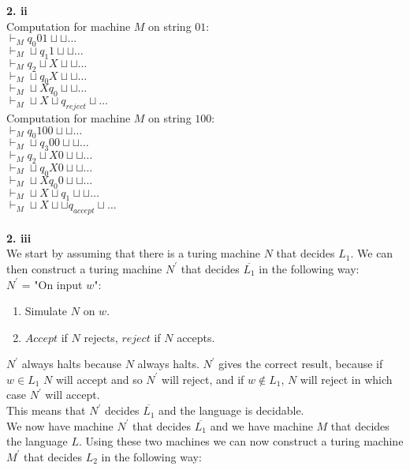 \documentclass[a4paper,12pt]{article}
\begin{document}
\textbf{2. ii} \\
Computation for machine $M$ on string $01$: \\
$\vdash_M q_0 0 1 \sqcup \sqcup \dots$ \\
$\vdash_M \sqcup q_1 1 \sqcup \sqcup \dots$ \\
$\vdash_M q_2 \sqcup X \sqcup \sqcup \dots$ \\
$\vdash_M \sqcup q_0 X \sqcup \sqcup \dots$ \\
$\vdash_M \sqcup X q_0 \sqcup \sqcup \dots$ \\
$\vdash_M \sqcup X \sqcup q_{reject} \sqcup \dots$ \\
Computation for machine $M$ on string $100$: \\ 
$\vdash_M q_0 1 0 0 \sqcup \sqcup \dots$ \\
$\vdash_M \sqcup q_3 0 0 \sqcup \sqcup \dots$ \\
$\vdash_M q_2 \sqcup X 0 \sqcup \sqcup \dots$ \\
$\vdash_M \sqcup q_0 X 0 \sqcup \sqcup \dots$ \\
$\vdash_M \sqcup X q_0 0 \sqcup \sqcup \dots$ \\
$\vdash_M \sqcup X \sqcup q_1 \sqcup \sqcup \dots$ \\
$\vdash_M \sqcup X \sqcup \sqcup q_{accept} \sqcup \dots$ \\
\\
\textbf{2. iii} \\
We start by assuming that there is a turing machine $N$ that decides $L_1$. We can then construct a turing machine $N^{'}$ that decides $\overline{L_1}$ in the following way: \\
$N^{'}$ = "On input $w$": 
\begin{enumerate}
\item Simulate $N$ on $w$.
\item $Accept$ if $N$ rejects, $reject$ if $N$ accepts.
\end{enumerate} 
$N^{'}$ always halts because $N$ always halts. $N^{'}$ gives the correct result, because if $w \in L_1$ $N$ will accept and so $N^{'}$ will reject, and if $w \notin L_1$, $N$ will reject in which case $N^{'}$ will accept. \\
This means that $N^{'}$ decides $\overline{L_1}$ and the language is decidable. \\ 
We now have machine $N^{'}$ that decides $\overline{L_1}$ and we have machine $M$ that decides the language $L$. Using these two machines we can now construct a turing machine $M^{'}$ that decides $L_2$ in the following way:\\ 
\end{document}
